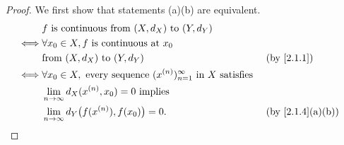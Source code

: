 \begin{proof}
  We first show that statements (a)(b) are equivalent.
  \begin{align*}
         & f \text{ is continuous from } (X, d_X) \text{ to } (Y, d_Y)                                                                              \\
    \iff & \forall x_0 \in X, f \text{ is continuous at } x_0                                                                                       \\
         & \text{from } (X, d_X) \text{ to } (Y, d_Y)                                                           &  & \text{(by \cref{2.1.1})}       \\
    \iff & \forall x_0 \in X, \text{ every sequence } (x^{(n)})_{n = 1}^\infty \text{ in } X \text{ satisfies }                                     \\
         & \lim_{n \to \infty} d_X(x^{(n)}, x_0) = 0 \text{ implies}                                                                                \\
         & \lim_{n \to \infty} d_Y\big(f(x^{(n)}), f(x_0)\big) = 0.                                             &  & \text{(by \cref{2.1.4}(a)(b))}
  \end{align*}


\end{proof}
